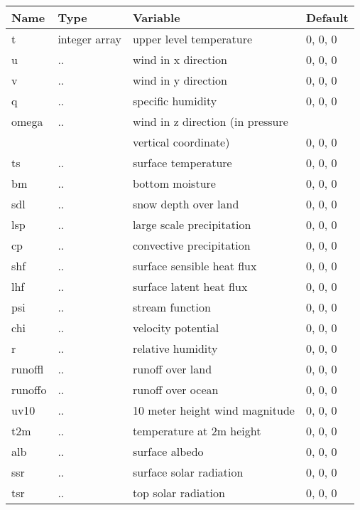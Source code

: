 \begin{tabular}{llll}
Name	&    Type          &	Variable			        &	Default    \\
\hline
t       &    integer array &    upper level temperature		&	0, 0, 0    \\
u	&    ..	           &    wind in x direction		&	0, 0, 0    \\
v	&    ..            &    wind in y direction		&	0, 0, 0    \\
q	&    ..	           &	specific humidity		&	0, 0, 0    \\
omega	&    ..	           &    wind in z direction (in pressure &                 \\
	&	           &	vertical coordinate)		&	0, 0, 0    \\
ts	&    ..            &	surface temperature		&	0, 0, 0    \\
bm	&    ..            &    bottom moisture          	&	0, 0, 0    \\
sdl	&    ..	           &	snow depth over land           	&	0, 0, 0    \\
lsp	&    ..	           &	large scale precipitation	&	0, 0, 0    \\
cp	&    ..	           &	convective precipitation	&	0, 0, 0    \\
shf	&    ..	           &	surface sensible heat flux      &	0, 0, 0    \\
lhf     &    ..	           &	surface latent heat flux        &	0, 0, 0    \\
psi	&    ..	           &	stream function			&	0, 0, 0    \\
chi	&    ..	           &	velocity potential		&	0, 0, 0    \\
r	&    ..	           &	relative humidity		&	0, 0, 0    \\
runoffl	&    ..	           &	runoff over land		&	0, 0, 0    \\
runoffo	&    ..	           &	runoff over ocean		&	0, 0, 0    \\
uv10	&    ..	           &    10 meter height wind magnitude  &	0, 0, 0    \\
t2m     &    ..            &    temperature at 2m height	&	0, 0, 0    \\
alb	&    ..	           &	surface albedo           	&	0, 0, 0    \\
ssr	&    ..	           &	surface solar radiation		&	0, 0, 0    \\
tsr	&    ..	           &	top solar radiation	        &	0, 0, 0    \\

\end{tabular}
